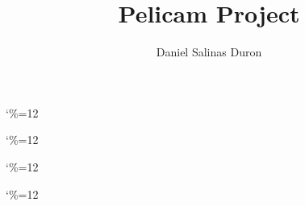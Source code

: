 \documentclass{tufte-book}
\title{Pelicam Project}
\author{Daniel Salinas Duron}
\begin{document}
\maketitle 

\frontmatter


{\catcode`\%=12 }

{\catcode`\%=12 }

{\catcode`\%=12 }

{\catcode`\%=12 }



\end{document}
